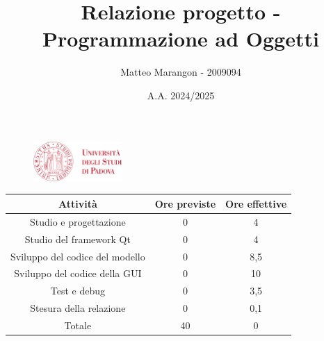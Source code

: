 \documentclass[10pt]{article}
\title{Relazione progetto - Programmazione ad Oggetti}
\author{Matteo Marangon - 2009094}
\date{A.A. 2024/2025}
\begin{document}
\begin{figure}
    \centering
    \includegraphics[width=0.3\textwidth]{./unipdlogo.png}
\end{figure}
\maketitle

\newpage

\tableofcontents
\newpage

\begin{center}
    \begin{tabular}{| c | c | c |} \hline
    Attività & Ore previste & Ore effettive \\\hline
    Studio e progettazione & 0 & 4 \\
    Studio del framework Qt & 0 & 4 \\
    Sviluppo del codice del modello & 0 & 8,5 \\
    Sviluppo del codice della GUI & 0 & 10 \\
    Test e debug & 0 & 3,5 \\
    Stesura della relazione & 0 & 0,1 \\\hline
    Totale & 40 & 0 \\\hline
    \end{tabular}
\end{center}
\end{document}
